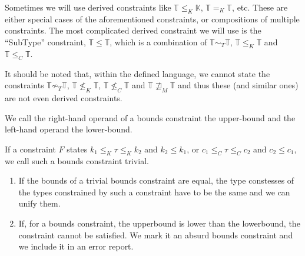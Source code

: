 \begin{remark}
    Sometimes we will use derived constraints like $\mathbb{T} \leq_K \mathbb{K}$, $\mathbb{T} =_K \mathbb{T}$, etc. These are either special cases of the aforementioned constraints, or compositions of multiple constraints. The most complicated derived constraint we will use is the ``SubType'' constraint, $\mathbb{T} \leq \mathbb{T}$, which is a combination of $\mathbb{T} \sim_T \mathbb{T}$, $\mathbb{T} \leq_K \mathbb{T}$ and $\mathbb{T} \leq_C \mathbb{T}$.
\end{remark}

\begin{remark}
    It should be noted that, within the defined language, we cannot state the constraints $\mathbb{T} \not\sim_T \mathbb{T}$, $\mathbb{T} \not\leq_K \mathbb{T}$, $\mathbb{T} \not\leq_C \mathbb{T}$ and $\mathbb{T} \not\sqsupseteq_M \mathbb{T}$ and thus these (and similar ones) are not even derived constraints.
\end{remark}


\begin{defn}[Bounds]
    We call the right-hand operand of a bounds constraint the upper-bound and the left-hand operand the lower-bound.
\end{defn}

\begin{defn}
    If a constraint $F$ states $k_1 \leq_K \tau \leq_K k_2$ and $k_2 \leq k_1$, or $c_1 \leq_C \tau \leq_C c_2$ and $c_2 \leq c_1$, we call such a bounds constraint trivial.

\end{defn}

\begin{lemma}
    \label{trivBoundsObs}
    \begin{enumerate}
        \item If the bounds of a trivial bounds constraint are equal, the type constesses of the types constrained by such a constraint have to be the same and we can unify them.
        \item If, for a bounds constraint, the upperbound is lower than the lowerbound, the constraint cannot be satisfied. We mark it an absurd bounds constraint and we include it in an error report.
    \end{enumerate}
\end{lemma}

